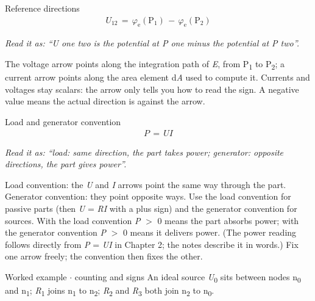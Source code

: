 \documentclass[11pt]{article}
\begin{document}
\begin{keepsection}
\begin{keepsection}
\begin{equationcard}{Reference directions}
\[ \begin{gathered} {U}_{12}\, =\, φ_{\mathrm{e}}(\mathrm{P}_{1})\, -\, φ_{\mathrm{e}}(\mathrm{P}_{2}) \end{gathered} \]
{\small \emph{Read it as: “U one two is the potential at P one minus the potential at P two”.}\par The voltage arrow points along the integration path of \textit{E}, from P\textsubscript{1} to P\textsubscript{2}; a current arrow points along the area element d\textit{A} used to compute it. Currents and voltages stay scalars: the arrow only tells you how to read the sign. A negative value means the actual direction is against the arrow.}
\end{equationcard}

\begin{equationcard}{Load and generator convention}
\[ \begin{gathered} {P}\, =\, {U}{I} \end{gathered} \]
{\small \emph{Read it as: “load: same direction, the part takes power; generator: opposite directions, the part gives power”.}\par Load convention: the \textit{U} and \textit{I} arrows point the same way through the part. Generator convention: they point opposite ways. Use the load convention for passive parts (then \textit{U} = \textit{R}\textit{I} with a plus sign) and the generator convention for sources. With the load convention \textit{P} \ensuremath{>} 0 means the part absorbs power; with the generator convention \textit{P} \ensuremath{>} 0 means it delivers power. (The power reading follows directly from \textit{P} = \textit{U}\textit{I} in Chapter 2; the notes describe it in words.) Fix one arrow freely; the convention then fixes the other.}
\end{equationcard}

\begin{workedbox}{Worked example \ensuremath{\cdot} counting and signs}
An ideal source \textit{U}\textsubscript{0} sits between nodes n\textsubscript{0} and n\textsubscript{1}; \textit{R}\textsubscript{1} joins n\textsubscript{1} to n\textsubscript{2}; \textit{R}\textsubscript{2} and \textit{R}\textsubscript{3} both join n\textsubscript{2} to n\textsubscript{0}.


\end{workedbox}
\end{keepsection}
\end{keepsection}
\end{document}

